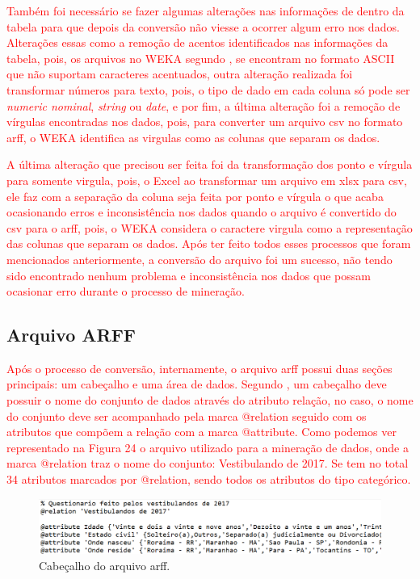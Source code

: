 \par
\textcolor{red}{Também foi necessário se fazer algumas alterações nas informações de dentro da tabela para que depois da conversão não viesse a ocorrer algum erro nos dados. Alterações essas como a remoção de acentos identificados nas informações da tabela, pois, os arquivos no WEKA segundo , se encontram no formato ASCII que não suportam caracteres acentuados, outra alteração realizada foi transformar números para texto, pois, o tipo de dado em cada coluna só pode ser \textit{numeric nominal}, \textit{string} ou \textit{date}, e por fim, a última alteração foi a remoção de vírgulas encontradas nos dados, pois, para converter um arquivo csv no formato arff, o WEKA identifica as virgulas como as colunas que separam os dados.}

\par
\textcolor{red}{A última alteração que precisou ser feita foi da transformação dos ponto e vírgula para somente virgula, pois, o Excel ao transformar um arquivo em xlsx para csv, ele faz com a separação da coluna seja feita por ponto e vírgula o que acaba ocasionando erros e inconsistência nos dados quando o arquivo é convertido do csv para o arff, pois, o WEKA considera o caractere virgula como a representação das colunas que separam os dados. Após ter feito todos esses processos que foram mencionados anteriormente, a conversão do arquivo foi um sucesso, não tendo sido encontrado nenhum problema e inconsistência nos dados que possam ocasionar erro durante o processo de mineração.}


\subsection{Arquivo ARFF}

\par
\textcolor{red}{Após o processo de conversão, internamente, o arquivo arff possui duas seções principais: um cabeçalho e uma área de dados. Segundo , um cabeçalho deve possuir o nome do conjunto de dados através do atributo relação, no caso, o nome do conjunto deve ser acompanhado pela marca @relation seguido com os atributos que compõem a relação com a marca @attribute. Como podemos ver representado na Figura 24 o arquivo utilizado para a mineração de dados, onde a marca @relation traz o nome do conjunto: Vestibulando de 2017. Se tem no total 34 atributos marcados por @relation, sendo todos os atributos do tipo categórico.} 

\par
\begin{figure}[!htp]
	\begin{center}
    \caption{\label{fig:waveform_fig} Cabeçalho do arquivo arff.}
	\includegraphics[scale=0.57]{Figuras/arquivo_arff.png}
	\end{center}
\end{figure}

